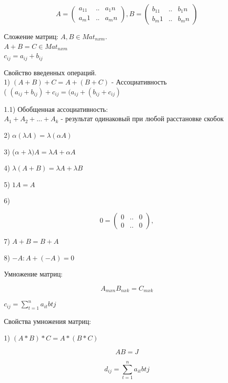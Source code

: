 \documentclass[a4paper]{article}
\begin{document}
\begin{equation*}
A =  
\begin{pmatrix}
   a_11 & .. & a_1n\\
     a_m1& ..&  a_mn
\end{pmatrix},
B =  
\begin{pmatrix}
   b_11 & .. & b_1n\\
     b_m1& ..&  b_mn
\end{pmatrix}
\end{equation*}

Сложение матриц: $A, B \in Mat_{nxm}$.\\
$A + B = C \in Mat_{nxm}$ \\
$c_{ij} = a_{ij} + b_{ij}$


Свойство введенных операций.\\
1) $(A + B) + C = A + (B + C)$ - Ассоциативность\\ ( $(a_{ij} + b_{ij}) + c_{ij} = (a_{ij} + (b_{ij} + c_{ij})$



1.1) Обобщенная ассоциативность:\\
$A_1 + A_2 + ... + A_k$ - результат одинаковый при любой расстановке скобок


2) $\alpha (\lambda A) =  \lambda (\alpha A)$


3) ($\alpha + \lambda) A =  \lambda A +  \alpha A$


4) $\lambda (A + B) =  \lambda A +  \lambda B$


5) $1 A  = A$


6) 

\begin{equation*}
0 =  
\begin{pmatrix}
   0 & .. & 0\\
     0& ..&  0
\end{pmatrix},
\end{equation*}


7) $A + B = B + A$


8) $-A: A + (-A) = 0$


Умножение матриц:

$$ A_{mxn} B_{nxk} = C _{mxk}$$

$ c_{ij} = \sum^n_{t=1}a_{it}b{tj}$



Свойства умножения матриц:

1) $(A * B) * C = A * (B * C)$

$$A B = J$$

$$d_{ij} = \sum^n_{t=1}a_{it}b{tj}$$
\end{document}
